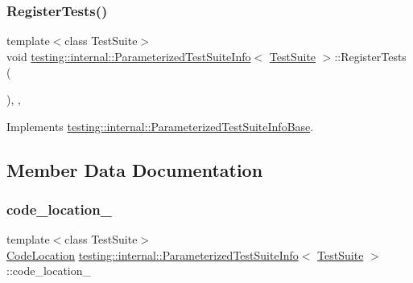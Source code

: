 \subsubsection{\texorpdfstring{Register\+Tests()}{RegisterTests()}}
{\footnotesize\ttfamily template$<$class Test\+Suite$>$ \\
void \hyperlink{classtesting_1_1internal_1_1ParameterizedTestSuiteInfo}{testing\+::internal\+::\+Parameterized\+Test\+Suite\+Info}$<$ \hyperlink{classtesting_1_1TestSuite}{Test\+Suite} $>$\+::Register\+Tests (\begin{DoxyParamCaption}{ }\end{DoxyParamCaption})\hspace{0.3cm}{\ttfamily [inline]}, {\ttfamily [override]}, {\ttfamily [virtual]}}



Implements \hyperlink{classtesting_1_1internal_1_1ParameterizedTestSuiteInfoBase_a41d7d663014af0c1e614c5a61293cb5a}{testing\+::internal\+::\+Parameterized\+Test\+Suite\+Info\+Base}.



\subsection{Member Data Documentation}
\mbox{\label{classtesting_1_1internal_1_1ParameterizedTestSuiteInfo_a64949444440296996cd9ee66e270a459}} 
\subsubsection{\texorpdfstring{code\+\_\+location\+\_\+}{code\_location\_}}
{\footnotesize\ttfamily template$<$class Test\+Suite$>$ \\
\hyperlink{structtesting_1_1internal_1_1CodeLocation}{Code\+Location} \hyperlink{classtesting_1_1internal_1_1ParameterizedTestSuiteInfo}{testing\+::internal\+::\+Parameterized\+Test\+Suite\+Info}$<$ \hyperlink{classtesting_1_1TestSuite}{Test\+Suite} $>$\+::code\+\_\+location\+\_\+\hspace{0.3cm}{\ttfamily [private]}}

